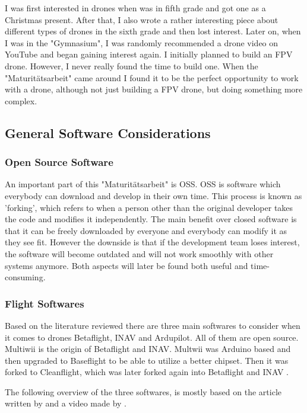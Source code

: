 \documentclass[svgnames]{article}
\begin{document}
	I was first interested in drones when was in fifth grade and got one as a Christmas present. After that, I also wrote a rather interesting piece about different types of drones in the sixth grade and then lost interest. Later on, when I was in the "Gymnasium", I was randomly recommended a drone video on YouTube and began gaining interest again. I initially planned to build an \gls{FPV} drone. However, I never really found the time to build one. When the "Maturitätsarbeit" came around I found it to be the perfect opportunity to work with a drone, although not just building a \gls{FPV} drone, but doing something more complex.


	
	\subsection{General Software Considerations}
	\subsubsection{Open Source Software}
	An important part of this "Maturitätsarbeit" is \gls{OSS}. \gls{OSS} is software which everybody can download and develop in their own time. This process is known as 'forking', which refers to when a person other than the original developer takes the code and modifies it independently. The main benefit over closed software is that it can be freely downloaded by everyone and everybody can modify it as they see fit. However the downside is that if the development team loses interest, the software will become outdated and will not work smoothly with other systems anymore. Both aspects will later be found both useful and time-consuming. 
	
	
	\subsubsection{Flight Softwares}
	Based on the literature reviewed there are three main softwares to consider when it comes to drones Betaflight, INAV and Ardupilot. All of them are open source. Multiwii is the origin of Betaflight and INAV. Multwii was Arduino based and then upgraded to Baseflight to be able to utilize a better chipset. Then it was forked to Cleanflight, which was later forked again into Betaflight and INAV \cite{history}. 
	
	The following overview of the three softwares, is mostly based on the article written by \textcite{firmwarearticle} and a video made by \textcite{firmwarevideo}.
	
\end{document}

